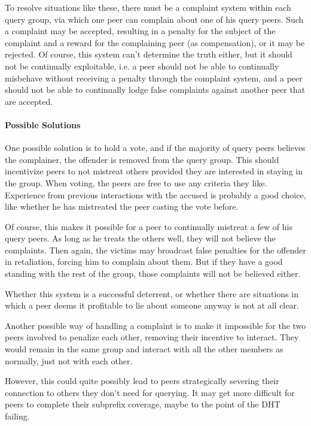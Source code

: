 To resolve situations like these, there must be a complaint system within each
query group, via which one peer can complain about one of his query peers. Such
a complaint may be accepted, resulting in a penalty for the subject of the
complaint and a reward for the complaining peer (as compensation), or it may be
rejected. Of course, this system can't determine the truth either, but it should
not be continually exploitable, i.e. a peer should not be able to continually
misbehave without receiving a penalty through the complaint system, and a peer
should not be able to continually lodge false complaints against another peer
that are accepted.

\paragraph{Possible Solutions}
One possible solution is to hold a vote, and if the majority of query peers
believes the complainer, the offender is removed from the query group. This
should incentivize peers to not mistreat others provided they are interested in
staying in the group. When voting, the peers are free to use any criteria they
like. Experience from previous interactions with the accused is probably a good
choice, like whether he has mistreated the peer casting the vote before.

Of course, this makes it possible for a peer to continually mistreat a few of
his query peers. As long as he treats the others well, they will not believe the
complaints. Then again, the victims may broadcast false penalties for the
offender in retaliation, forcing him to complain about them. But if they have a
good standing with the rest of the group, those complaints will not be believed
either.

Whether this system is a successful deterrent, or whether there are situations
in which a peer deems it profitable to lie about someone anyway is not at all
clear.

Another possible way of handling a complaint is to make it impossible for the
two peers involved to penalize each other, removing their incentive to interact.
They would remain in the same group and interact with all the other members as
normally, just not with each other.

However, this could quite possibly lead to peers strategically severing their
connection to others they don't need for querying. It may get more difficult for
peers to complete their subprefix coverage, maybe to the point of the DHT
failing.

